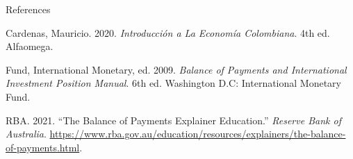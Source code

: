 \documentclass[
  ignorenonframetext,
]{beamer}
\newlength{\cslhangindent}
\newenvironment{CSLReferences}[2] %
 {\begin{list}{}{%
  \setlength{\itemindent}{0pt}
  \setlength{\leftmargin}{0pt}
  \setlength{\parsep}{0pt}
  \ifodd #1
   \setlength{\leftmargin}{\cslhangindent}
   \setlength{\itemindent}{-1\cslhangindent}
  \fi
  \setlength{\itemsep}{#2\baselineskip}}}
 {\end{list}}
\begin{document}
\begin{frame}[allowframebreaks]{References}
\label{refs}
\begin{CSLReferences}{1}{0}
Cardenas, Mauricio. 2020. \emph{Introducción a La {Economía}
{Colombiana}}. 4th ed. Alfaomega.

Fund, International Monetary, ed. 2009. \emph{Balance of Payments and
International Investment Position Manual}. 6th ed. Washington D.C:
International Monetary Fund.

RBA. 2021. {``The {Balance} of {Payments} {\textbar} {Explainer}
{\textbar} {Education}.''} \emph{Reserve Bank of Australia}.
\url{https://www.rba.gov.au/education/resources/explainers/the-balance-of-payments.html}.

\end{CSLReferences}
\end{frame}
\end{document}
